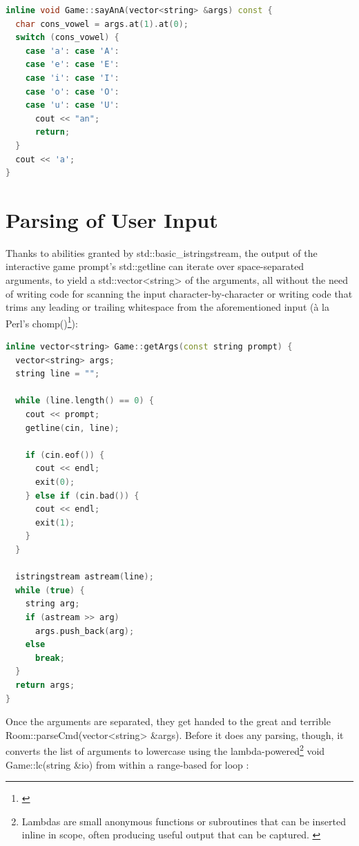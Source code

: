 \documentclass[man,12pt]{apa6}
\begin{document}
\begin{framed}
\begin{lstlisting}[language=C++]
inline void Game::sayAnA(vector<string> &args) const {
  char cons_vowel = args.at(1).at(0);
  switch (cons_vowel) {
    case 'a': case 'A':
    case 'e': case 'E':
    case 'i': case 'I':
    case 'o': case 'O':
    case 'u': case 'U':
      cout << "an";
      return;
  }
  cout << 'a';
}
\end{lstlisting}
\end{framed}

\section{Parsing of User Input}
Thanks to abilities granted by \textsf{std::basic\_istringstream},
the output of the interactive game prompt's \textsf{std::getline} can
iterate over space-separated arguments, to yield a
\textsf{std::vector<string>} of  the arguments, all without the need of writing code
for scanning the input character-by-character or writing code that trims any
leading or trailing whitespace from the aforementioned input (à la Perl's \textsf{chomp()}\footnote{\cite{chomp-perldoc}}):

\begin{framed}
\begin{lstlisting}[language=C++]
inline vector<string> Game::getArgs(const string prompt) {
  vector<string> args;
  string line = "";

  while (line.length() == 0) {
    cout << prompt;
    getline(cin, line);

    if (cin.eof()) {
      cout << endl;
      exit(0);
    } else if (cin.bad()) {
      cout << endl;
      exit(1);
    }
  }

  istringstream astream(line);
  while (true) {
    string arg;
    if (astream >> arg)
      args.push_back(arg);
    else
      break;
  }
  return args;
}
\end{lstlisting}
\end{framed}

Once the arguments are separated, they get handed to the great and terrible
\textsf{Room::parseCmd(vector<string> \&args)}.  Before it does any parsing,
though, it converts the list of arguments to lowercase using the
lambda-powered\footnote{Lambdas are small anonymous functions or subroutines
that can be inserted inline in scope, often producing useful output that can be
captured. \parencite{lambda-cpp}} \textsf{void Game::lc(string \&io)} from within
a range-based \textsf{for} loop \parencite{rangeloop-cpp}:
\end{document}

